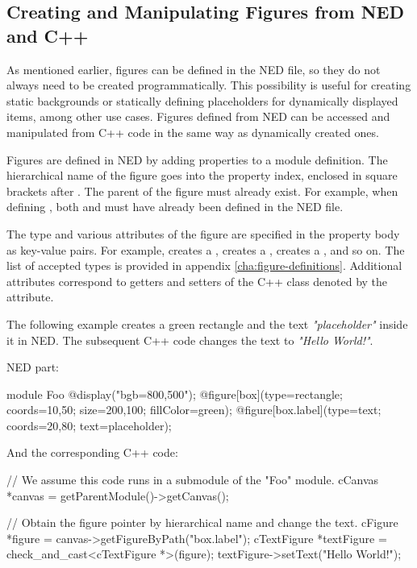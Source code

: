 \subsection{Creating and Manipulating Figures from NED and C++}
\label{sec:graphics:creating-and-manipulating-figures}

As mentioned earlier, figures can be defined in the NED file, so they do not
always need to be created programmatically. This possibility is useful for
creating static backgrounds or statically defining placeholders for dynamically
displayed items, among other use cases. Figures defined from NED can be accessed
and manipulated from C++ code in the same way as dynamically created ones.

Figures are defined in NED by adding  properties to a module
definition. The hierarchical name of the figure goes into the property index,
enclosed in square brackets after . The parent of the figure must
already exist. For example, when defining , both  and
 must have already been defined in the NED file.

The type and various attributes of the figure are specified in the property body
as key-value pairs. For example,  creates a ,
 creates a , 
creates a , and so on. The list of accepted types is
provided in appendix \ref{cha:figure-definitions}. Additional attributes
correspond to getters and setters of the C++ class denoted by the 
attribute.

The following example creates a green rectangle and the text
\textit{"placeholder"} inside it in NED. The subsequent C++ code changes the
text to \textit{"Hello World!"}.

NED part:

\begin{ned}
module Foo
{
    @display("bgb=800,500");
    @figure[box](type=rectangle; coords=10,50; size=200,100; fillColor=green);
    @figure[box.label](type=text; coords=20,80; text=placeholder);
}
\end{ned}

And the corresponding C++ code:

\begin{cpp}
// We assume this code runs in a submodule of the "Foo" module.
cCanvas *canvas = getParentModule()->getCanvas();

// Obtain the figure pointer by hierarchical name and change the text.
cFigure *figure = canvas->getFigureByPath("box.label");
cTextFigure *textFigure = check_and_cast<cTextFigure *>(figure);
textFigure->setText("Hello World!");
\end{cpp}

